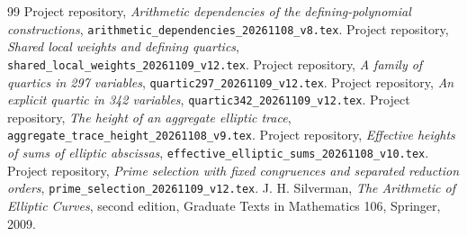 \documentclass[11pt,a4paper]{article}
\theoremstyle{remark}\newtheorem{remark}[theorem]{Remark}
\begin{document}
\begin{thebibliography}{99}
 Project repository,
\emph{Arithmetic dependencies of the defining-polynomial constructions},
\nolinkurl{arithmetic_dependencies_20261108_v8.tex}.
 Project repository,
\emph{Shared local weights and defining quartics},
\nolinkurl{shared_local_weights_20261109_v12.tex}.
 Project repository,
\emph{A family of quartics in 297 variables},
\nolinkurl{quartic297_20261109_v12.tex}.
 Project repository,
\emph{An explicit quartic in 342 variables},
\nolinkurl{quartic342_20261109_v12.tex}.
 Project repository,
\emph{The height of an aggregate elliptic trace},
\nolinkurl{aggregate_trace_height_20261108_v9.tex}.
 Project repository,
\emph{Effective heights of sums of elliptic abscissas},
\nolinkurl{effective_elliptic_sums_20261108_v10.tex}.
 Project repository,
\emph{Prime selection with fixed congruences and separated reduction orders},
\nolinkurl{prime_selection_20261109_v12.tex}.
 J. H. Silverman,
\emph{The Arithmetic of Elliptic Curves}, second edition,
Graduate Texts in Mathematics 106, Springer, 2009.
\end{thebibliography}
\end{document}
